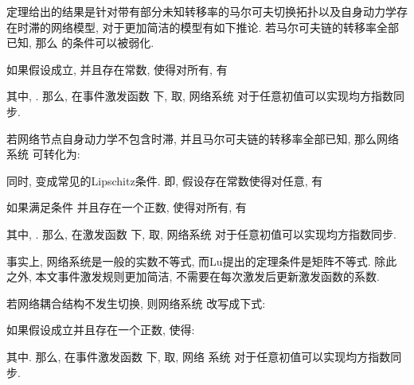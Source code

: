         定理给出的结果是针对带有部分未知转移率的马尔可夫切换拓扑以及自身动力学存在时滞的网络模型, 对于更加简洁的模型有如下推论. 若马尔可夫链的转移率全部已知, 那么 的条件可以被弱化.
        \begin{cor}
        如果假设成立, 并且存在常数, 使得对所有, 有
            \begin{comment}
            &\pi+a+\pi_u-c\gamma(\lambda_2+\rho\beta)\leq0,
            \end{comment}
        其中, .
        那么, 在事件激发函数  下, 取, 网络系统  对于任意初值可以实现均方指数同步.
        \end{cor}
        若网络节点自身动力学不包含时滞, 并且马尔可夫链的转移率全部已知, 那么网络系统  可转化为:
        \begin{comment}\label{cortwo}
          \nonumber \dot{x}_{i}(t)&=f(t,x_{i}(t))-c\sum^N_{j=1}l_{ij}(r_{t})\Gamma[x_{j}(t_k)
            -x_{i}(t_{k})]+u_i(t),\\
            &\quad t_{k}\leq t< t_{k+1} \quad i = 1,\cdots,N.
        \end{comment}
        同时,  变成常见的Lipschitz条件. 即, 假设存在常数使得对任意, 有
        \begin{comment}\label{asss3}
        \|f(t,x(t))-f(t,y(t))\|\leq\alpha_1\|x(t)-y(t)\|.
        \end{comment}
        \begin{cor}\label{cor2}
        如果满足条件  并且存在一个正数, 使得对所有, 有
        \begin{comment}\label{corcon2}
            \pi+a+\pi_u-c\gamma(\lambda_2+\rho\beta)\leq0,
        \end{comment}
        其中, .
        那么, 在激发函数  下, 取, 网络系统  对于任意初值可以实现均方指数同步.
        \end{cor}
        \begin{rem}
        事实上, 网络系统是一般的实数不等式, 而Lu提出的定理条件是矩阵不等式. 除此之外, 本文事件激发规则更加简洁, 不需要在每次激发后更新激发函数的系数.
       \end{rem}
       若网络耦合结构不发生切换, 则网络系统  改写成下式:
        \begin{comment}\label{sysnomarkov}
        \nonumber\dot{x}_{i}(t)&=f(t,x_{i}(t),x_i(t-\tau))-c\sum^N_{j=1}l_{ij}\Gamma[x_{j}(t_k)-x_{i}(t_{k})]+u_i(t),\\
           &\quad t_{k}\leq t< t_{k+1} \quad i = 1,\cdots,N.
        \end{comment}
        \begin{cor}
        如果假设成立并且存在一个正数, 使得:
           \begin{comment}
            \pi+a-c\gamma(\lambda_2+\rho\beta)\leq0,
            \end{comment}
        其中.
        那么, 在事件激发函数  下, 取, 网络
        系统  对于任意初值可以实现均方指数同步.
        \end{cor}
